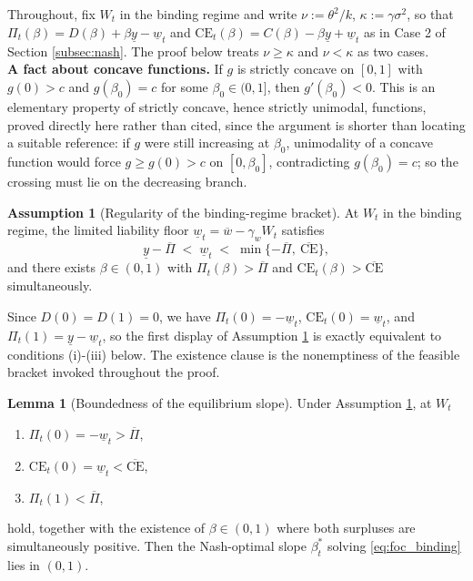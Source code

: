 \documentclass{article}
\theoremstyle{definition}
\newtheorem{assumption}{Assumption}[section]
\newtheorem{lemma}{Lemma}[section]
\theoremstyle{plain}
\begin{document}
\begin{appendices}
Throughout, fix $W_t$ in the binding regime and write $\nu:=\theta^2/k$, $\kappa:=\gamma\sigma^2$, so that $\Pi_t(\beta)=D(\beta)+\beta\underline y-\underline w_t$ and $\text{CE}_t(\beta)=C(\beta)-\beta\underline y+\underline w_t$ as in Case 2 of Section \ref{subsec:nash}. The proof below treats $\nu\ge\kappa$ and $\nu<\kappa$ as two cases. \\
\textbf{A fact about concave functions.} If $g$ is strictly concave on $[0,1]$ with $g(0)>c$ and $g(\beta_0)=c$ for some $\beta_0\in(0,1]$, then $g'(\beta_0)<0$. This is an elementary property of strictly concave, hence strictly unimodal, functions, proved directly here rather than cited, since the argument is shorter than locating a suitable reference: if $g$ were still increasing at $\beta_0$, unimodality of a concave function would force $g\ge g(0)>c$ on $[0,\beta_0]$, contradicting $g(\beta_0)=c$; so the crossing must lie on the decreasing branch. \\
\begin{assumption}[Regularity of the binding-regime bracket]\label{ass:beta_bounds_reg}
At $W_t$ in the binding regime, the limited liability floor $\underline w_t=\overline w-\gamma_w W_t$ satisfies
\[
\underline y-\overline\Pi \;<\; \underline w_t \;<\; \min\{-\overline\Pi,\ \overline{\text{CE}}\},
\]
and there exists $\beta\in(0,1)$ with $\Pi_t(\beta)>\overline\Pi$ and $\text{CE}_t(\beta)>\overline{\text{CE}}$ simultaneously.
\end{assumption}
Since $D(0)=D(1)=0$, we have $\Pi_t(0)=-\underline w_t$, $\text{CE}_t(0)=\underline w_t$, and $\Pi_t(1)=\underline y-\underline w_t$, so the first display of Assumption \ref{ass:beta_bounds_reg} is exactly equivalent to conditions (i)-(iii) below. The existence clause is the nonemptiness of the feasible bracket invoked throughout the proof.\\
\begin{lemma}[Boundedness of the equilibrium slope]\label{lem:beta_bounds}
Under Assumption \ref{ass:beta_bounds_reg}, at $W_t$
\begin{enumerate}
    \item[(i)] $\Pi_t(0)=-\underline w_t>\overline\Pi$,
    \item[(ii)] $\text{CE}_t(0)=\underline w_t<\overline{\text{CE}}$,
    \item[(iii)] $\Pi_t(1)<\overline\Pi$,
\end{enumerate}
hold, together with the existence of $\beta\in(0,1)$ where both surpluses are simultaneously positive. Then the Nash-optimal slope $\beta_t^*$ solving \eqref{eq:foc_binding} lies in $(0,1)$.

\end{lemma}
\end{appendices}
\end{document}
